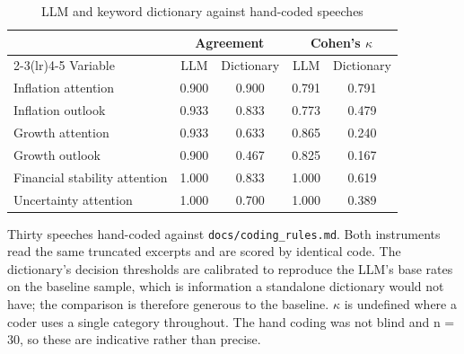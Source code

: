 \begin{table}[htbp]
\centering
\caption{LLM and keyword dictionary against hand-coded speeches}
\label{tab:dictionary-benchmark}
\begin{tabular}{lcccc}
\toprule
& \multicolumn{2}{c}{Agreement} & \multicolumn{2}{c}{Cohen's $\kappa$} \\
\cmidrule(lr){2-3}\cmidrule(lr){4-5}
Variable & LLM & Dictionary & LLM & Dictionary \\
\midrule
Inflation attention & 0.900 & 0.900 & 0.791 & 0.791 \\
Inflation outlook & 0.933 & 0.833 & 0.773 & 0.479 \\
Growth attention & 0.933 & 0.633 & 0.865 & 0.240 \\
Growth outlook & 0.900 & 0.467 & 0.825 & 0.167 \\
Financial stability attention & 1.000 & 0.833 & 1.000 & 0.619 \\
Uncertainty attention & 1.000 & 0.700 & 1.000 & 0.389 \\
\bottomrule
\end{tabular}
\begin{minipage}{0.86\textwidth}
\vspace{0.6em}
\footnotesize Thirty speeches hand-coded against \texttt{docs/coding\_rules.md}. Both instruments read the same truncated excerpts and are scored by identical code. The dictionary's decision thresholds are calibrated to reproduce the LLM's base rates on the baseline sample, which is information a standalone dictionary would not have; the comparison is therefore generous to the baseline. $\kappa$ is undefined where a coder uses a single category throughout. The hand coding was not blind and n = 30, so these are indicative rather than precise.
\end{minipage}
\end{table}

